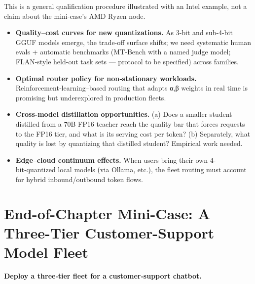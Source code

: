 This is a general qualification procedure illustrated with an Intel
example, not a claim about the mini-case's AMD Ryzen node.

\label{what-we-still-dont-know}


\begin{itemize}
\tightlist
\item
  \textbf{Quality--cost curves for new quantizations.} As 3-bit and
  sub-4-bit GGUF models emerge, the trade-off surface shifts; we need
  systematic human evals + automatic benchmarks (MT‑Bench with a named
  judge model; FLAN-style held-out task sets --- protocol to be
  specified) across families.
\item
  \textbf{Optimal router policy for non‑stationary workloads.}
  Reinforcement‑learning--based routing that adapts α,β weights in real
  time is promising but underexplored in production fleets.
\item
  \textbf{Cross-model distillation opportunities.} (a) Does a smaller
  student distilled from a 70B FP16 teacher reach the quality bar that
  forces requests to the FP16 tier, and what is its serving cost per
  token? (b) Separately, what quality is lost by quantizing that
  distilled student? Empirical work needed.
\item
  \textbf{Edge--cloud continuum effects.} When users bring their own
  4-bit‑quantized local models (via Ollama, etc.), the fleet routing
  must account for hybrid inbound/outbound token flows.
\end{itemize}

\section{End-of-Chapter Mini-Case: A Three-Tier Customer-Support Model
Fleet}\label{end-of-chapter-mini-case-a-three-tier-customer-support-model-fleet}

\textbf{Deploy a three‑tier fleet for a customer‑support chatbot.}

